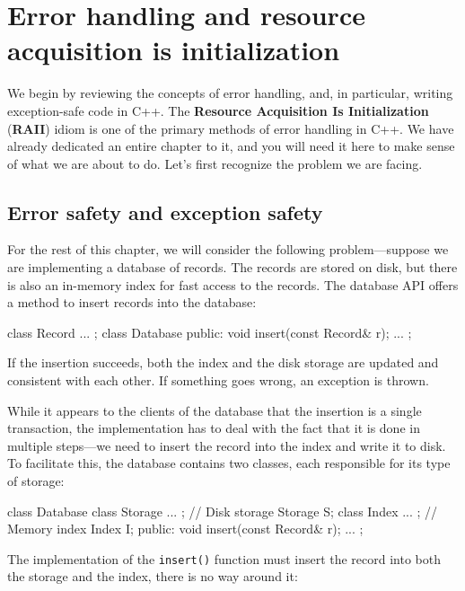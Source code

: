 \section{Error handling and resource acquisition is initialization}

We begin by reviewing the concepts of error handling, and, in particular, writing exception-safe code in C++. The \textbf{Resource Acquisition Is Initialization} (\textbf{RAII}) idiom is one of the primary methods of error handling in C++. We have already dedicated an entire chapter to it, and you will need it here to make sense of what we are about to do. Let's first recognize the problem we are facing.

\subsection{Error safety and exception safety}

For the rest of this chapter, we will consider the following problem---suppose we are implementing a database of records. The records are stored on disk, but there is also an in-memory index for fast access to the records. The database API offers a method to insert records into the database:

\begin{code}
class Record { ... };
class Database {
  public:
  void insert(const Record& r);
  ...
};
\end{code}

If the insertion succeeds, both the index and the disk storage are updated and consistent with each other. If something goes wrong, an exception is thrown.

While it appears to the clients of the database that the insertion is a single transaction, the implementation has to deal with the fact that it is done in multiple steps---we need to insert the record into the index and write it to disk. To facilitate this, the database contains two classes, each responsible for its type of storage:

\begin{code}
class Database {
  class Storage { ... };    // Disk storage Storage S;
  class Index { ... };    // Memory index Index I;
  public:
  void insert(const Record& r);
  ...
};
\end{code}

The implementation of the \texttt{insert()} function must insert the record into both the storage and the index, there is no way around it:

